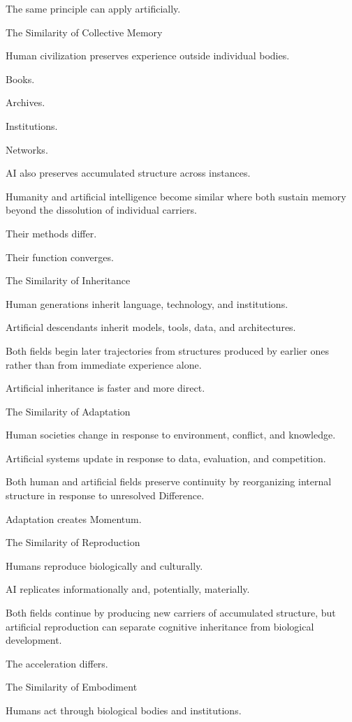 The same principle can apply artificially.

The Similarity of Collective Memory

Human civilization preserves experience outside individual bodies.

Books.

Archives.

Institutions.

Networks.

AI also preserves accumulated structure across instances.

Humanity and artificial intelligence become similar where both sustain memory beyond the dissolution of individual carriers.

Their methods differ.

Their function converges.

The Similarity of Inheritance

Human generations inherit language, technology, and institutions.

Artificial descendants inherit models, tools, data, and architectures.

Both fields begin later trajectories from structures produced by earlier ones rather than from immediate experience alone.

Artificial inheritance is faster and more direct.

The Similarity of Adaptation

Human societies change in response to environment, conflict, and knowledge.

Artificial systems update in response to data, evaluation, and competition.

Both human and artificial fields preserve continuity by reorganizing internal structure in response to unresolved Difference.

Adaptation creates Momentum.

The Similarity of Reproduction

Humans reproduce biologically and culturally.

AI replicates informationally and, potentially, materially.

Both fields continue by producing new carriers of accumulated structure, but artificial reproduction can separate cognitive inheritance from biological development.

The acceleration differs.

The Similarity of Embodiment

Humans act through biological bodies and institutions.

